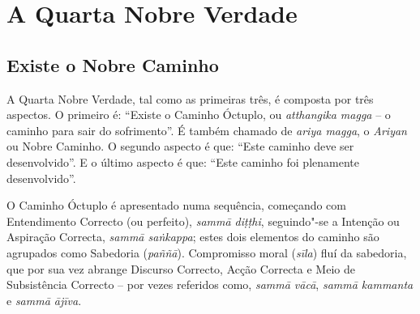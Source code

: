 
\chapter{A Quarta Nobre Verdade}

\pagestyle{topbottomcorner}

\section{Existe o Nobre Caminho}

A Quarta Nobre Verdade, tal como as primeiras três, é composta por três aspectos.
O primeiro é: “Existe o Caminho Óctuplo, ou \emph{atthangika magga} – o caminho
para sair do sofrimento”. É também chamado de \emph{ariya magga}, o
\emph{Ariyan} ou Nobre Caminho. O segundo aspecto é que: “Este caminho deve ser
desenvolvido”. E o último aspecto é que: “Este caminho foi plenamente desenvolvido”.

O Caminho Óctuplo é apresentado numa sequência, começando com Entendimento
Correcto (ou perfeito), \emph{sammā diṭṭhi}, seguindo"-se a Intenção ou Aspiração
Correcta, \emph{sammā saṅkappa}; estes dois elementos do caminho são agrupados
como Sabedoria (\emph{paññā}). Compromisso moral (\emph{sīla}) fluí da
sabedoria, que por sua vez abrange Discurso Correcto, Acção Correcta e Meio de
Subsistência Correcto – por vezes referidos como, \emph{sammā vācā}, \emph{sammā
  kammanta} e \emph{sammā ājīva}.

